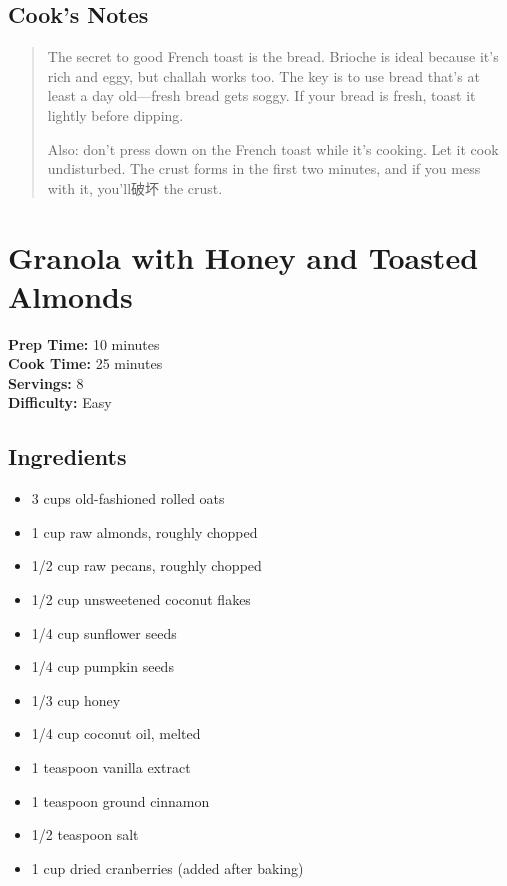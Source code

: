 \documentclass[
    language=english,
    doctype=recipe-book,
    institution=none,
]{../../omnilatex}
\begin{document}
\subsection*{Cook's Notes}
\begin{quote}
The secret to good French toast is the bread. Brioche is ideal because it's rich and eggy, but challah works too. The key is to use bread that's at least a day old---fresh bread gets soggy. If your bread is fresh, toast it lightly before dipping.

Also: don't press down on the French toast while it's cooking. Let it cook undisturbed. The crust forms in the first two minutes, and if you mess with it, you'll破坏 the crust.
\end{quote}

\section*{Granola with Honey and Toasted Almonds}

\begin{recipebox}
\textbf{Prep Time:} 10 minutes\\
\textbf{Cook Time:} 25 minutes\\
\textbf{Servings:} 8\\
\textbf{Difficulty:} Easy
\end{recipebox}

\subsection*{Ingredients}

\begin{itemize}
    \item 3 cups old-fashioned rolled oats
    \item 1 cup raw almonds, roughly chopped
    \item 1/2 cup raw pecans, roughly chopped
    \item 1/2 cup unsweetened coconut flakes
    \item 1/4 cup sunflower seeds
    \item 1/4 cup pumpkin seeds
    \item 1/3 cup honey
    \item 1/4 cup coconut oil, melted
    \item 1 teaspoon vanilla extract
    \item 1 teaspoon ground cinnamon
    \item 1/2 teaspoon salt
    \item 1 cup dried cranberries (added after baking)
\end{itemize}
\end{document}
